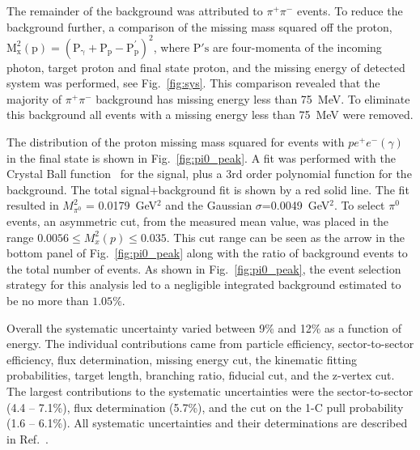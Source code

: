 \documentclass[aps,prc,twocolumn,floatfix,showpacs,preprintnumbers,amsmath,amssymb,superscriptaddress,linenumbers]{revtex4-1}
\def\pizT{$\pi^{0} \ $}
\begin{document}
The remainder of the background was attributed to $\pi^+\pi^-$
events. To reduce the background further, a comparison of the 
missing mass squared off the proton, $\mathrm{M_x^2(p) =(P_\gamma + P_p -P^{'}_p)^2}$, where $\mathrm{P's}$ are four-momenta of the incoming photon, target proton and final state proton, and the missing energy of detected system was performed, see Fig.~\ref{fig:sys}. This 
comparison revealed that the majority of $\pi^+\pi^-$ background 
has missing energy less than 75~MeV. To eliminate this background 
all events with a missing energy less than 75~MeV were removed.

The distribution of the proton missing mass squared for events with 
$pe^+e^-(\gamma)$ in the final state is shown in Fig.~\ref{fig:pi0_peak}. 
A fit was performed with the Crystal Ball function~\cite{Oreglia:1980cs,
Skwarnicki:1986xj} for the signal, plus a 3rd order polynomial function 
for the background. The total signal+background fit is shown by a red solid 
line. The fit resulted in $M_{\pi^0}^2$ = 0.0179~GeV$^2$ and the Gaussian 
$\sigma$=0.0049~GeV$^2$. To select \pizT events, an asymmetric cut, from 
the measured mean value, was placed in the range $0.0056 \le  M_x^2(p) 
\le 0.035$. This cut range can be seen as the arrow in the bottom 
panel of Fig.~\ref{fig:pi0_peak} along with the ratio of background 
events to the total number of events. As shown in Fig.~\ref{fig:pi0_peak}, 
the event selection strategy for this analysis led to a 
negligible integrated background estimated to be no more than $1.05\%$.

Overall the systematic uncertainty varied between 9\% and 12\% as a function of energy. The individual contributions came from particle efficiency, sector-to-sector efficiency, 
flux determination, missing energy cut, the kinematic fitting probabilities, 
target length, branching ratio, fiducial cut, and the z-vertex cut.
The largest contributions to the systematic uncertainties 
were the sector-to-sector (4.4 -- 7.1\%), flux determination (5.7\%),
and the cut on the 1-C pull probability (1.6 -- 6.1\%). All systematic 
uncertainties and their determinations are described in Ref.~\cite{Kunkel}.

\end{document}
